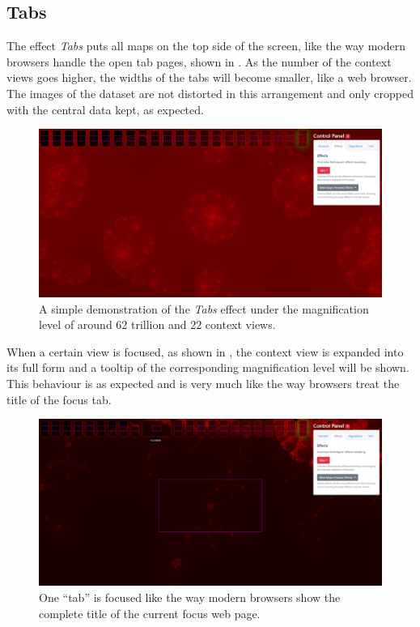 \subsection{Tabs}
\label{chap5:tabs}

The effect \emph{Tabs} puts all \glspl{map} on the top side of the screen, like the way modern browsers handle the open tab pages, shown in . As the number of the context views goes higher, the widths of the tabs will become smaller, like a web browser. The images of the dataset are not distorted in this arrangement and only cropped with the central data kept, as expected.

\begin{figure}[H]
\centering
\includegraphics[width=\textwidth,keepaspectratio]{Figures/Chapter5/tabs.png}
\decoRule
\caption[Tabs Effect]{A simple demonstration of the \emph{Tabs} effect under the magnification level of around $62$ trillion and $22$ context views.}
\label{fig:chap5:tabs}
\end{figure}

When a certain view is focused, as shown in , the context view is expanded into its full form and a tooltip of the corresponding magnification level will be shown. This behaviour is as expected and is very much like the way browsers treat the title of the focus tab.

\begin{figure}[H]
\centering
\includegraphics[width=\textwidth,keepaspectratio]{Figures/Chapter5/tabs2.png}
\decoRule
\caption[Tabs Effect with One Focused Context View]{One ``tab'' is focused like the way modern browsers show the complete title of the current focus web page.}
\label{fig:chap5:tabs2}
\end{figure}

